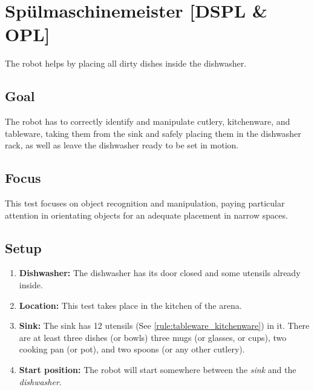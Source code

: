 \section{Sp{\"u}lmaschinemeister [DSPL \& OPL]}
The robot helps by placing all dirty dishes inside the dishwasher.

\subsection{Goal}
The robot has to correctly identify and manipulate cutlery, kitchenware, and tableware, taking them from the sink and safely placing them in the dishwasher rack, as well as leave the dishwasher ready to be set in motion.

\subsection{Focus}
This test focuses on object recognition and manipulation, paying particular attention in orientating objects for an adequate placement in narrow spaces.

\subsection{Setup}
\begin{enumerate}
	\item \textbf{Dishwasher:} The dishwasher has its door closed and some utensils already inside.
	\item \textbf{Location:} This test takes place in the kitchen of the arena.
	\item \textbf{Sink:} The sink has 12 utensils (See \ref{rule:tableware_kitchenware}) in it. There are at least three dishes (or bowls) three mugs (or glasses, or cups), two cooking pan (or pot), and two spoons (or any other cutlery).
	\item \textbf{Start position:} The robot will start somewhere between the \textit{sink} and the \textit{dishwasher}.
\end{enumerate}



